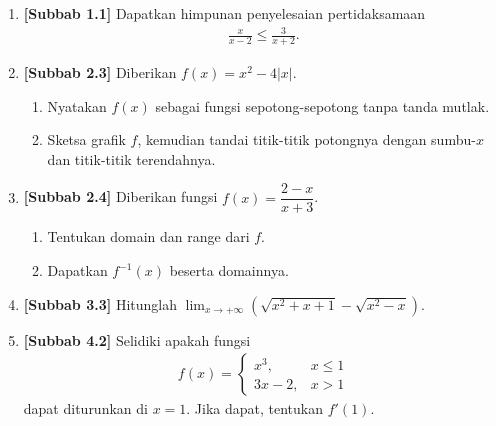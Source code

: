 \documentclass[10pt,openany,a4paper]{article}
\theoremstyle{definition}
\theoremstyle{definition}
\theoremstyle{plain}
\begin{document}
\begin{enumerate}
    \item \textbf{[Subbab 1.1]} Dapatkan himpunan penyelesaian pertidaksamaan
    \begin{align*}
        \frac{x}{x-2}\leq\frac{3}{x+2}.
    \end{align*}

    \item \textbf{[Subbab 2.3]} Diberikan $f(x)=x^2-4|x|$.
    \begin{enumerate}
        \item Nyatakan $f(x)$ sebagai fungsi sepotong-sepotong tanpa tanda mutlak.
        \item Sketsa grafik $f$, kemudian tandai titik-titik potongnya dengan sumbu-$x$ dan titik-titik terendahnya.
    \end{enumerate}

    \item \textbf{[Subbab 2.4]} Diberikan fungsi $f(x)=\dfrac{2-x}{x+3}$.
    \begin{enumerate}
        \item Tentukan domain dan range dari $f$.
        \item Dapatkan $f^{-1}(x)$ beserta domainnya.
    \end{enumerate}

    \item \textbf{[Subbab 3.3]} Hitunglah $\displaystyle\lim_{x\to+\infty}\left(\sqrt{x^2+x+1}-\sqrt{x^2-x}\right)$.

    \item \textbf{[Subbab 4.2]} Selidiki apakah fungsi
    \begin{align*}
        f(x)=\begin{cases}
            x^3, & x\leq 1\\
            3x-2, & x>1
        \end{cases}
    \end{align*}
    dapat diturunkan di $x=1$. Jika dapat, tentukan $f'(1)$.
\end{enumerate}

\newpage
\end{document}
